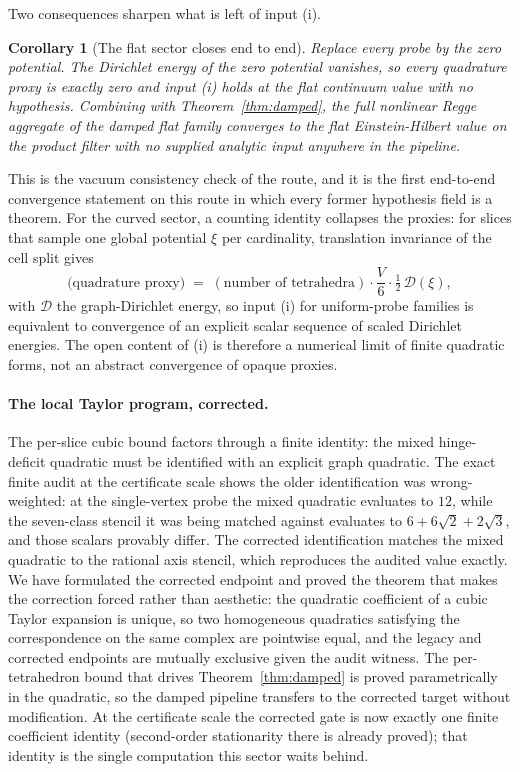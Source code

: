 \documentclass[11pt,letterpaper]{article}
\newtheorem{corollary}[theorem]{Corollary}
\theoremstyle{definition}
\begin{document}
Two consequences sharpen what is left of input (i).

\begin{corollary}[The flat sector closes end to end]\label{cor:flat}
Replace every probe by the zero potential.  The Dirichlet energy of
the zero potential vanishes, so every quadrature proxy is exactly
zero and input (i) holds at the flat continuum value with no
hypothesis.  Combining with Theorem~\ref{thm:damped}, the full
nonlinear Regge aggregate of the damped flat family converges to the
flat Einstein-Hilbert value on the product filter with no supplied
analytic input anywhere in the pipeline.
\end{corollary}

This is the vacuum consistency check of the route, and it is the
first end-to-end convergence statement on this route in which every
former hypothesis field is a theorem.  For the curved sector, a
counting identity collapses the proxies: for slices that sample one
global potential $\xi$ per cardinality, translation invariance of the
cell split gives
\begin{equation}\label{eq:uniformprobe}
\text{(quadrature proxy)} \;=\;
(\text{number of tetrahedra})\cdot\frac{V}{6}\cdot
\tfrac12\,\mathcal{D}(\xi),
\end{equation}
with $\mathcal{D}$ the graph-Dirichlet energy, so input (i) for
uniform-probe families is equivalent to convergence of an explicit
scalar sequence of scaled Dirichlet energies.  The open content of
(i) is therefore a numerical limit of finite quadratic forms, not an
abstract convergence of opaque proxies.

\paragraph{The local Taylor program, corrected.}
The per-slice cubic bound factors through a finite identity: the mixed
hinge-deficit quadratic must be identified with an explicit graph
quadratic.  The exact finite audit at the certificate scale shows the
older identification was wrong-weighted: at the single-vertex probe
the mixed quadratic evaluates to $12$, while the seven-class stencil
it was being matched against evaluates to $6+6\sqrt2+2\sqrt3$, and
those scalars provably differ.  The corrected identification matches
the mixed quadratic to the rational axis stencil, which reproduces the
audited value exactly.  We have formulated the corrected endpoint and
proved the theorem that makes the correction forced rather than
aesthetic: the quadratic coefficient of a cubic Taylor expansion is
unique, so two homogeneous quadratics satisfying the correspondence on
the same complex are pointwise equal, and the legacy and corrected
endpoints are mutually exclusive given the audit witness.  The
per-tetrahedron bound that drives Theorem~\ref{thm:damped} is proved
parametrically in the quadratic, so the damped pipeline transfers to
the corrected target without modification.  At the certificate scale
the corrected gate is now exactly one finite coefficient identity
(second-order stationarity there is already proved); that identity is
the single computation this sector waits behind.
\end{document}
